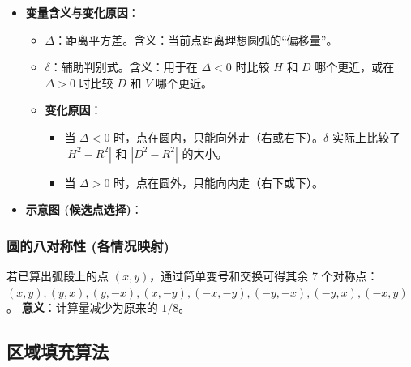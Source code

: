 \documentclass[UTF8]{ctexart}
\begin{document}
\begin{itemize}
    \item \textbf{变量含义与变化原因}：
    \begin{itemize}
        \item $\Delta$：距离平方差。含义：当前点距离理想圆弧的“偏移量”。
        \item $\delta$：辅助判别式。含义：用于在 $\Delta < 0$ 时比较 $H$ 和 $D$ 哪个更近，或在 $\Delta > 0$ 时比较 $D$ 和 $V$ 哪个更近。
        \item \textbf{变化原因}：
            \begin{itemize}
                \item 当 $\Delta < 0$ 时，点在圆内，只能向外走（右或右下）。$\delta$ 实际上比较了 $|H^2-R^2|$ 和 $|D^2-R^2|$ 的大小。
                \item 当 $\Delta > 0$ 时，点在圆外，只能向内走（右下或下）。
            \end{itemize}
    \end{itemize}
    \item \textbf{示意图 (候选点选择)}：
    \begin{center}
    \end{center}
\end{itemize}

\subsubsection{圆的八对称性 (各情况映射)}
若已算出弧段上的点 $(x, y)$，通过简单变号和交换可得其余 7 个对称点：
$(x, y), (y, x), (y, -x), (x, -y), (-x, -y), (-y, -x), (-y, x), (-x, y)$。
\textbf{意义}：计算量减少为原来的 $1/8$。
\subsection{区域填充算法}
\end{document}
